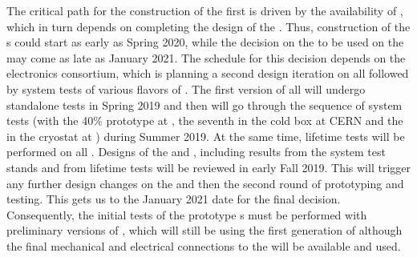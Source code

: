 The critical path for the construction of the first 
  is driven by the availability of ,
which in turn depends on completing the design of the
. Thus, construction
of the s could start as early as Spring 2020, while the
decision on the  to be used on the 
may come as late as January 2021. The schedule for this decision
depends on the  electronics consortium, which is
planning a second design iteration on all 
followed by system tests of various flavors of .
The first version of all  will undergo
standalone tests in Spring 2019 and then will go through the 
sequence of system tests (with the 40\%  prototype at ,
the seventh   in the cold box at CERN
and the  in the  cryostat at )
during Summer 2019. At the same time, lifetime tests will be performed 
on all . Designs of the  and , including results
from the system test stands and from lifetime tests will be reviewed
in early Fall 2019. This will trigger any further design
changes on the  and then the second round of prototyping
and testing. This gets us to the January 2021 date for the final
 decision. Consequently, the initial
tests of the  prototype s must be performed
with preliminary versions of , which will still be using
the first generation of  although the final 
mechanical and electrical connections to the  will be available and used.

